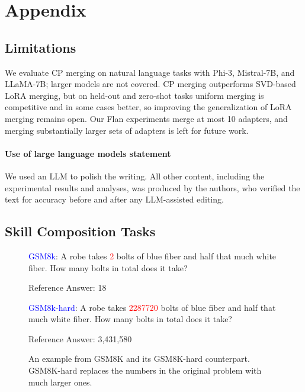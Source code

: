 \documentclass[10pt]{article} %
\begin{document}
\newpage
\appendix
\section{Appendix}

\subsection{Limitations}

We evaluate CP merging on natural language tasks with Phi-3, Mistral-7B, and LLaMA-7B; larger models are not covered. CP merging outperforms SVD-based LoRA merging, but on held-out and zero-shot tasks uniform merging is competitive and in some cases better, so improving the generalization of LoRA merging remains open. Our Flan experiments merge at most 10 adapters, and merging substantially larger sets of adapters is left for future work.

\paragraph{Use of large language models statement}

We used an LLM to polish the writing. All other content, including the experimental results and analyses, was produced by the authors, who verified the text for accuracy before and after any LLM-assisted editing.




\subsection{Skill Composition Tasks}
\label{sec:skill_composition}

\begin{figure}[h]
        \centering
        \begin{prompt}
            [title={GSM8k vs GSM8k-hard}] { \textcolor{blue}{GSM8k}: A robe takes \textcolor{red}{2} bolts of blue fiber and half that much white fiber. How many bolts in total does it take?

            Reference Answer: 18

            \textcolor{blue}{GSM8k-hard}: A robe takes \textcolor{red}{2287720} bolts of blue fiber and half that much white fiber. How many bolts in total does it take?

            Reference Answer: 3,431,580 }
        \end{prompt}
        \caption{An example from GSM8K and its GSM8K-hard counterpart. GSM8K-hard
        replaces the numbers in the original problem with much larger ones.}
        \label{prompt-verifier}
\end{figure}
\end{document}
